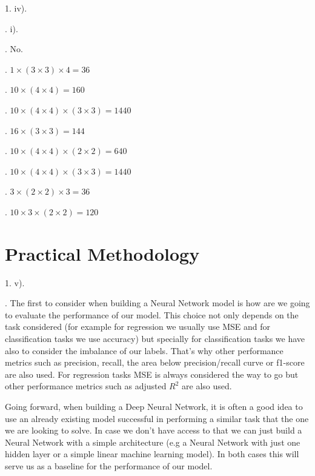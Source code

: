 1. iv).

. i).

. No.

. $1 \times (3 \times 3) \times 4 = 36 $

. $ 10 \times (4 \times 4) = 160$

. $ 10 \times (4 \times 4 ) \times (3 \times 3) = 1440$

. $ 16 \times (3 \times 3) = 144$

. $ 10 \times (4 \times 4) \times (2 \times 2) = 640 $

. $ 10 \times (4 \times 4) \times (3 \times 3) = 1440 $

. $ 3 \times (2 \times 2) \times 3 = 36 $

. $ 10 \times 3 \times (2 \times 2) = 120 $



\section{Practical Methodology}

1. v).

. The first to consider when building a Neural Network model is how are we going to evaluate the performance of our model. This choice not only depends on the task considered (for example for regression we usually use MSE and for classification tasks we use accuracy) but specially for classification tasks we have also to consider the imbalance of our labels. That's why other performance metrics such as precision, recall, the area below precision/recall curve or f1-score are also used. For regression tasks MSE is always considered the way to go but other performance metrics such as adjusted $R^2$ are also used.

Going forward, when building a Deep Neural Network, it is often a good idea to use an already existing model successful in performing a similar task that the one we are looking to solve. In case we don't have access to that we can just build a Neural Network with a simple architecture (e.g a Neural Network with just one hidden layer or a simple linear machine learning model). In both cases this will serve us as a baseline for the performance of our model.

\newpage

